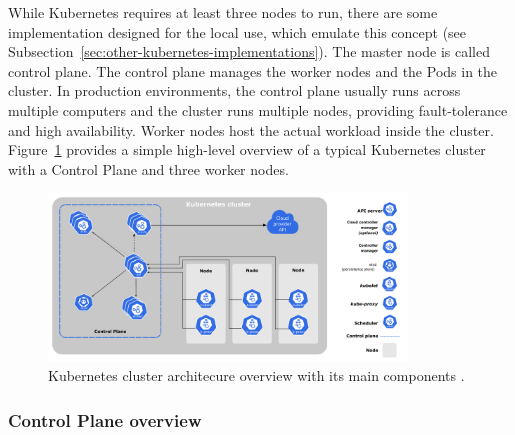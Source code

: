 While Kubernetes requires at least three nodes to run, there are some implementation designed for the local use, which emulate this concept (see Subsection~\ref{sec:other-kubernetes-implementations}). The master node is called control plane. The control plane manages the worker nodes and the Pods in the cluster. In production environments, the control plane usually runs across multiple computers and the cluster runs multiple nodes, providing fault-tolerance and high availability. Worker nodes host the actual workload inside the cluster. Figure~\ref{img:kubernetes-architecture} provides a simple high-level overview of a typical Kubernetes cluster with a Control Plane and three worker nodes.

\begin{figure}[!hbt]
	\begin{center}
		\includegraphics[width=0.85\textwidth]{images/components-of-kubernetes.pdf}
        \caption{Kubernetes cluster architecure overview with its main components \cite{kubernetes-components}.}
		\label{img:kubernetes-architecture}
	\end{center}
\end{figure}

\subsubsection*{Control Plane overview}


